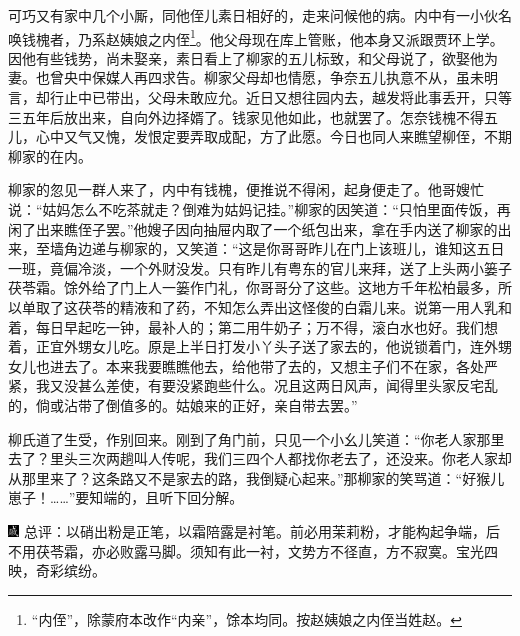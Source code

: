 可巧又有家中几个小厮，同他侄儿素日相好的，走来问候他的病。内中有一小伙名唤钱槐者，乃系赵姨娘之内侄\footnote{“内侄”，除蒙府本改作“内亲”，馀本均同。按赵姨娘之内侄当姓赵。}。他父母现在库上管账，他本身又派跟贾环上学。因他有些钱势，尚未娶亲，素日看上了柳家的五儿标致，和父母说了，欲娶他为妻。也曾央中保媒人再四求告。柳家父母却也情愿，争奈五儿执意不从，虽未明言，却行止中已带出，父母未敢应允。近日又想往园内去，越发将此事丢开，只等三五年后放出来，自向外边择婿了。钱家见他如此，也就罢了。怎奈钱槐不得五儿，心中又气又愧，发恨定要弄取成配，方了此愿。今日也同人来瞧望柳侄，不期柳家的在内。

柳家的忽见一群人来了，内中有钱槐，便推说不得闲，起身便走了。他哥嫂忙说：“姑妈怎么不吃茶就走？倒难为姑妈记挂。”柳家的因笑道：“只怕里面传饭，再闲了出来瞧侄子罢。”他嫂子因向抽屉内取了一个纸包出来，拿在手内送了柳家的出来，至墙角边递与柳家的，又笑道：“这是你哥哥昨儿在门上该班儿，谁知这五日一班，竟偏冷淡，一个外财没发。只有昨儿有粤东的官儿来拜，送了上头两小篓子茯苓霜。馀外给了门上人一篓作门礼，你哥哥分了这些。这地方千年松柏最多，所以单取了这茯苓的精液和了药，不知怎么弄出这怪俊的白霜儿来。说第一用人乳和着，每日早起吃一钟，最补人的；第二用牛奶子；万不得，滚白水也好。我们想着，正宜外甥女儿吃。原是上半日打发小丫头子送了家去的，他说锁着门，连外甥女儿也进去了。本来我要瞧瞧他去，给他带了去的，又想主子们不在家，各处严紧，我又没甚么差使，有要没紧跑些什么。况且这两日风声，闻得里头家反宅乱的，倘或沾带了倒值多的。姑娘来的正好，亲自带去罢。”

柳氏道了生受，作别回来。刚到了角门前，只见一个小幺儿笑道：“你老人家那里去了？里头三次两趟叫人传呢，我们三四个人都找你老去了，还没来。你老人家却从那里来了？这条路又不是家去的路，我倒疑心起来。”那柳家的笑骂道：“好猴儿崽子！\ldots{}\ldots{}”要知端的，且听下回分解。

{\includegraphics[width=3mm]{../Images/00005}  \kaishu 总评：以硝出粉是正笔，以霜陪露是衬笔。前必用茉莉粉，才能构起争端，后不用茯苓霜，亦必败露马脚。须知有此一衬，文势方不径直，方不寂寞。宝光四映，奇彩缤纷。}


